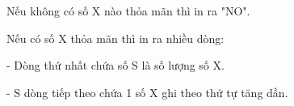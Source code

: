 Nếu không có số X nào thỏa mãn thì in ra "NO".  

   Nếu có số X thỏa mãn thì in ra nhiều dòng:   


   - Dòng thứ nhất chứa số S là số lượng số X.   


   - S dòng tiếp theo chứa 1 số X ghi theo thứ tự tăng dần.